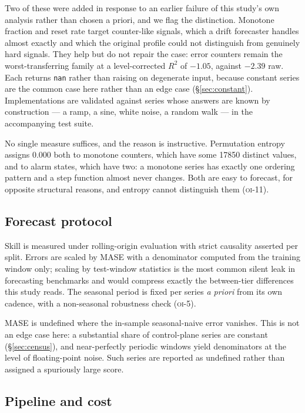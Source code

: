 \documentclass[11pt,a4paper]{article}
\newcommand{\num}[1]{#1}
\newcommand{\oi}[1]{\textsc{oi-#1}}
\begin{document}
Two of these were added in response to an earlier failure of this study's own
analysis rather than chosen a priori, and we flag the distinction. Monotone
fraction and reset rate target counter-like signals, which a drift forecaster
handles almost exactly and which the original profile could not distinguish from
genuinely hard signals. They help but do not repair the case: error counters
remain the worst-transferring family at a level-corrected \(R^2\) of
\(-1.05\), against \(-2.39\) raw. Each
returns \texttt{nan} rather than raising on degenerate input, because constant
series are the common case here rather than an edge case
(\S\ref{sec:constant}). Implementations are validated against series whose
answers are known by construction --- a ramp, a sine, white noise, a random walk
--- in the accompanying test suite.

No single measure suffices, and the reason is instructive. Permutation entropy
assigns \num{0.000} both to monotone counters, which have some \num{17850}
distinct values, and to alarm states, which have two: a monotone series has
exactly one ordering pattern and a step function almost never changes. Both are
easy to forecast, for opposite structural reasons, and entropy cannot
distinguish them (\oi{11}).

\subsection{Forecast protocol}

Skill is measured under rolling-origin evaluation with strict causality
asserted per split. Errors are scaled by MASE with a denominator computed from
the training window only; scaling by test-window statistics is the most common
silent leak in forecasting benchmarks and would compress exactly the
between-tier differences this study reads. The seasonal period is fixed per
series \emph{a priori} from its own cadence, with a non-seasonal robustness
check (\oi{5}).

MASE is undefined where the in-sample seasonal-naive error vanishes. This is
not an edge case here: a substantial share of control-plane series are constant
(\S\ref{sec:census}), and near-perfectly periodic windows yield denominators at
the level of floating-point noise. Such series are reported as undefined rather
than assigned a spuriously large score.

\subsection{Pipeline and cost}
\label{sec:pipeline}
\end{document}
